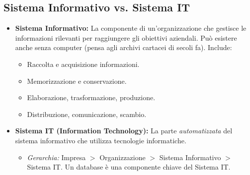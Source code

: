 \documentclass{article}
\begin{document}
	\subsection{Sistema Informativo vs. Sistema IT}
	\begin{itemize}
		\item \textbf{Sistema Informativo:} La componente di un'organizzazione che gestisce le informazioni rilevanti per raggiungere gli obiettivi aziendali. Può esistere anche senza computer (pensa agli archivi cartacei di secoli fa). Include:
		\begin{itemize}
			\item Raccolta e acquisizione informazioni.
			\item Memorizzazione e conservazione.
			\item Elaborazione, trasformazione, produzione.
			\item Distribuzione, comunicazione, scambio.
		\end{itemize}
		\item \textbf{Sistema IT (Information Technology):} La parte \textit{automatizzata} del sistema informativo che utilizza tecnologie informatiche.
		\begin{itemize}
			\item \textit{Gerarchia:} Impresa $>$ Organizzazione $>$ Sistema Informativo $>$ Sistema IT. Un database è una componente chiave del Sistema IT.
		\end{itemize}
	\end{itemize}
	
\end{document}
